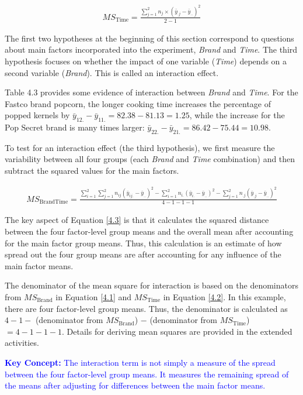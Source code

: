 \documentclass[
]{book}
\begin{document}
\begin{align}\label{4.2}
MS_{\text{Time}} = \frac{\sum_{j=1}^{2} n_j \times (\bar{y}_{.j} - \bar{y}_{..})^2}{2-1}
\tag{4.2}
\end{align}

The first two hypotheses at the beginning of this section correspond to questions about main factors incorporated into the experiment, \emph{Brand} and \emph{Time}. The third hypothesis focuses on whether the impact of one variable (\emph{Time}) depends on a second variable (\emph{Brand}). This is called an interaction effect.

Table 4.3 provides some evidence of interaction between \emph{Brand} and \emph{Time}. For the Fastco brand popcorn, the longer cooking time increases the percentage of popped kernels by \(\bar{y}_{12.} - \bar{y}_{11.} = 82.38 - 81.13 = 1.25\), while the increase for the Pop Secret brand is many times larger: \(\bar{y}_{22.} - \bar{y}_{21.} = 86.42 - 75.44 = 10.98\).

To test for an interaction effect (the third hypothesis), we first measure the variability between all four groups (each \emph{Brand} and \emph{Time} combination) and then subtract the squared values for the main factors.

\begin{align}\label{4.3}
MS_{\text{BrandTime}} = \frac{\sum_{i=1}^{2}\sum_{j=1}^{2} n_{ij}(\bar{y}_{ij.} - \bar{y}_{..})^2 - \sum_{i=1}^{2} n_{i.}(\bar{y}_{i.} - \bar{y}_{..})^2 - \sum_{j=1}^{2} n_{.j}(\bar{y}_{.j} - \bar{y}_{..})^2}{4 - 1 - 1 - 1}
\tag{4.3}
\end{align}

The key aspect of Equation \ref{4.3} is that it calculates the squared distance between the four factor-level group means and the overall mean after accounting for the main factor group means. Thus, this calculation is an estimate of how spread out the four group means are after accounting for any influence of the main factor means.

The denominator of the mean square for interaction is based on the denominators from \(MS_{\text{Brand}}\) in Equation \ref{4.1} and \(MS_{\text{Time}}\) in Equation \ref{4.2}. In this example, there are four factor-level group means. Thus, the denominator is calculated as \(4 - 1 -\) (denominator from \(MS_{\text{Brand}}\)) \(-\) (denominator from \(MS_{\text{Time}}\)) \(= 4 - 1 - 1 - 1\). Details for deriving mean squares are provided in the extended activities.

\textbf{\textcolor{blue}{Key Concept:}}
\textcolor{blue}{
The interaction term is not simply a measure of the spread between the four factor-level group means. It measures the remaining spread of the means after adjusting for differences between the main factor means.}
\end{document}
